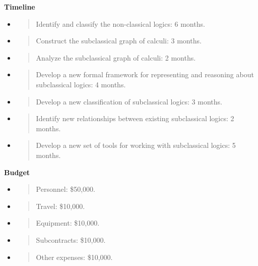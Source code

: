 \textbf{Timeline}

\begin{itemize}
\item
  \begin{quote}
  Identify and classify the non-classical logics: 6 months.
  \end{quote}
\item
  \begin{quote}
  Construct the subclassical graph of calculi: 3 months.
  \end{quote}
\item
  \begin{quote}
  Analyze the subclassical graph of calculi: 2 months.
  \end{quote}
\item
  \begin{quote}
  Develop a new formal framework for representing and reasoning about
  subclassical logics: 4 months.
  \end{quote}
\item
  \begin{quote}
  Develop a new classification of subclassical logics: 3 months.
  \end{quote}
\item
  \begin{quote}
  Identify new relationships between existing subclassical logics: 2
  months.
  \end{quote}
\item
  \begin{quote}
  Develop a new set of tools for working with subclassical logics: 5
  months.
  \end{quote}
\end{itemize}

\textbf{Budget}

\begin{itemize}
\item
  \begin{quote}
  Personnel: \$50,000.
  \end{quote}
\item
  \begin{quote}
  Travel: \$10,000.
  \end{quote}
\item
  \begin{quote}
  Equipment: \$10,000.
  \end{quote}
\item
  \begin{quote}
  Subcontracts: \$10,000.
  \end{quote}
\item
  \begin{quote}
  Other expenses: \$10,000.
  \end{quote}
\end{itemize}

